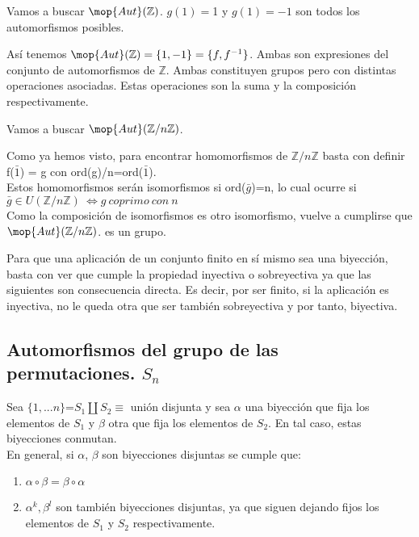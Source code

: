 \documentclass[nochap]{apuntes}
\begin{document}
\begin{example}
 Vamos a buscar $\mop{Aut}(\mathbb{Z})$. $g(1)=$1 y $g(1)=-1$ son todos los automorfismos posibles.

 Así tenemos $\mop{Aut}(\mathbb{Z})=\{1,-1\}=\{f, f^{-1}\}$. Ambas son expresiones del conjunto de automorfismos de $\mathbb{Z}$. Ambas constituyen grupos pero con distintas operaciones asociadas. Estas operaciones son la suma y la composición respectivamente.
\end{example}

\begin{example}
 Vamos a buscar $\mop{Aut}(\mathbb{Z}/n\mathbb{Z})$.

 Como ya hemos visto, para encontrar homomorfismos de $\mathbb{Z}/n\mathbb{Z}$  basta con definir f($\bar{1}$) = g con ord(g)/n=ord($\bar{1}$).\\
 Estos homomorfismos serán isomorfismos si  ord($\bar{g}$)=n, lo cual ocurre si $\bar{g}\in U(\mathbb{Z}/n\mathbb{Z}) \ \Leftrightarrow g \ coprimo \ con\ n$\\
 Como la composición de isomorfismos es otro isomorfismo, vuelve a cumplirse que $\mop{Aut}(\mathbb{Z}/n\mathbb{Z})$.  es un grupo.
\end{example}

Para que una aplicación de un conjunto finito en sí mismo sea una biyección, basta con ver que cumple la propiedad inyectiva o sobreyectiva ya que las siguientes son consecuencia directa. Es decir, por ser finito, si la aplicación es inyectiva, no le queda otra que ser también sobreyectiva y por tanto, biyectiva.

\subsection{Automorfismos del grupo de las permutaciones. $S_n$}
Sea $\{1,...n\}$=$S_1\coprod S_2\equiv$ unión disjunta y sea $\alpha$  una biyección que fija los elementos de $S_1$  y $\beta$
otra que fija los elementos de $S_2$. En tal caso, estas biyecciones conmutan.\\
En general, si $\alpha$,  $\beta$  son biyecciones disjuntas se cumple que:
\begin{enumerate}
 \item $\alpha \circ \beta = \beta \circ \alpha$
 \item $\alpha^{k}, \beta^{l}$  son también biyecciones disjuntas, ya que siguen dejando fijos los elementos de $S_1$  y $S_2$  respectivamente.
\end{enumerate}
\end{document}
